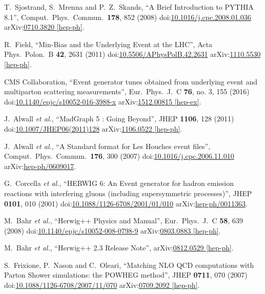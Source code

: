 \begin{thebibliography}{99}
T.~Sjostrand, S.~Mrenna and P.~Z.~Skands, ``A Brief Introduction to PYTHIA 8.1'', Comput.\ Phys.\ Commun.\ {\bf 178}, 852 (2008) doi:\href{http://dx.doi.org/10.1016/j.cpc.2008.01.036}{10.1016/j.cpc.2008.01.036} arXiv:\href{https://arxiv.org/abs/0710.3820L}{0710.3820 [hep-ph]}.

R.~Field, ``Min-Bias and the Underlying Event at the LHC'', Acta Phys.\ Polon.\ B {\bf 42}, 2631 (2011) doi:\href{http://dx.doi.org/10.5506/APhysPolB.42.2631}{10.5506/APhysPolB.42.2631} arXiv:\href{https://arxiv.org/abs/1110.5530}{1110.5530 [hep-ph]}. 

CMS Collaboration, ``Event generator tunes obtained from underlying event and multiparton scattering measurements'', Eur.\ Phys.\ J.\ C {\bf 76}, no. 3, 155 (2016) doi:\href{http://dx.doi.org/10.1140/epjc/s10052-016-3988-x}{10.1140/epjc/s10052-016-3988-x} arXiv:\href{https://arxiv.org/abs/1512.00815}{1512.00815 [hep-ex]}.

J.~Alwall {\it et al.}, ``MadGraph 5 : Going Beyond'', JHEP {\bf 1106}, 128 (2011) doi:\href{https://doi.org/10.1007/JHEP06(2011)128}{10.1007/JHEP06(2011)128} arXiv:\href{https://arxiv.org/abs/1106.0522}{1106.0522 [hep-ph]}.

J.~Alwall {\it et al.}, ``A Standard format for Les Houches event files'', Comput.\ Phys.\ Commun.\ {\bf 176}, 300 (2007) doi:\href{http://dx.doi.org/10.1016/j.cpc.2006.11.010}{10.1016/j.cpc.2006.11.010} arXiv:\href{https://arxiv.org/abs/hep-ph/0609017}{hep-ph/0609017}.
 
G.~Corcella {\it et al.}, ``HERWIG 6: An Event generator for hadron emission reactions with interfering gluons (including supersymmetric processes)'', JHEP {\bf 0101}, 010 (2001) doi:\href{http://dx.doi.org/10.1088/1126-6708/2001/01/010}{10.1088/1126-6708/2001/01/010} arXiv:\href{https://arxiv.org/abs/hep-ph/0011363}{hep-ph/0011363}. 
 
M.~Bahr {\it et al.}, ``Herwig++ Physics and Manual'', Eur.\ Phys.\ J.\ C {\bf 58}, 639 (2008) doi:\href{http://dx.doi.org/10.1140/epjc/s10052-008-0798-9}{10.1140/epjc/s10052-008-0798-9} arXiv:\href{https://arxiv.org/abs/0803.0883}{0803.0883 [hep-ph]}.

M.~Bahr {\it et al.}, ``Herwig++ 2.3 Release Note'', arXiv:\href{https://arxiv.org/abs/0812.0529}{0812.0529 [hep-ph]}.

S.~Frixione, P.~Nason and C.~Oleari, ``Matching NLO QCD computations with Parton Shower simulations: the POWHEG method'', JHEP {\bf 0711}, 070 (2007) doi:\href{http://dx.doi.org/10.1088/1126-6708/2007/11/070}{10.1088/1126-6708/2007/11/070} arXiv:\href{https://arxiv.org/abs/0709.2092}{0709.2092 [hep-ph]}.


\end{thebibliography}

